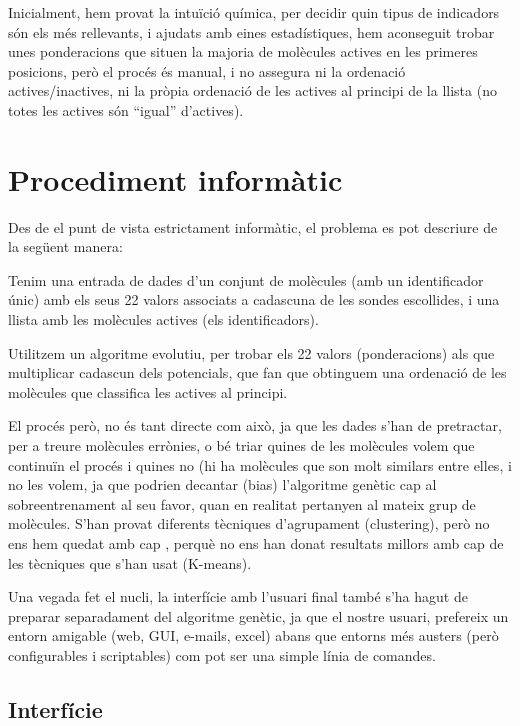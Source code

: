 
Inicialment, hem provat la intuïció química, per decidir quin tipus de
indicadors són els més rellevants, i ajudats amb eines estadístiques, hem
aconseguit trobar unes ponderacions que situen la majoria de molècules actives
en les primeres posicions, però el procés és manual, i no assegura ni la
ordenació actives/inactives, ni la pròpia ordenació de les actives al principi
de la llista (no totes les actives són ``igual'' d'actives).

\section{Procediment informàtic} %
\label{sec:Procediment informatic}

Des de el punt de vista estrictament informàtic, el problema es pot descriure de
la següent manera:

Tenim una entrada de dades d'un conjunt de molècules (amb un identificador
únic) amb els seus 22 valors associats a cadascuna de les sondes escollides, i una
llista amb les molècules actives (els identificadors).

Utilitzem un algoritme evolutiu, per trobar els 22 valors (ponderacions) als que
multiplicar cadascun dels potencials, que fan que obtinguem una ordenació de les
molècules que classifica les actives al principi.

El procés però, no és tant directe com això, ja que les dades s'han de
pretractar, per a treure molècules errònies, o bé triar quines de les molècules
volem que continuïn el procés i quines no (hi ha molècules que son molt similars
entre elles, i no les volem, ja que podrien decantar (bias) l'algoritme genètic cap al
sobreentrenament al seu favor, quan en realitat pertanyen al mateix grup de
molècules.  S'han provat diferents tècniques d'agrupament (clustering), però no ens hem
quedat amb cap , perquè no ens han donat resultats millors amb cap de les
tècniques que s'han usat (K-means).

Una vegada fet el nucli, la interfície amb l'usuari final també s'ha hagut
de preparar separadament del algoritme genètic, ja que el nostre usuari,
prefereix un entorn amigable (web, GUI, e-mails, excel) abans que entorns més
austers (però configurables i scriptables) com pot ser una simple línia de
comandes.  

\subsection{Interfície} %
\label{sub:Interficie}

